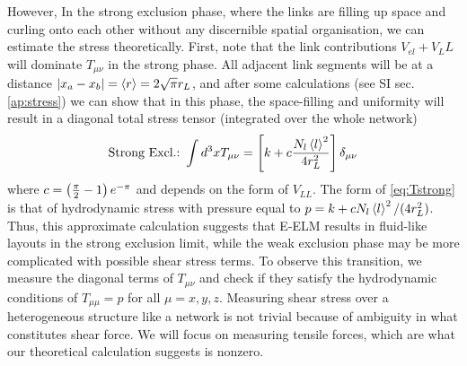 \documentclass[nofootinbib,preprint,floatfix,endfloats]{revtex4} %
\begin{document}
However, In the strong exclusion phase, where the links are filling up space and curling onto each other without any discernible spatial organisation, we can estimate the stress theoretically. First, note that the link contributions $V_{el}+V_LL$ will dominate $T_{\mu\nu}$ in the strong phase. All adjacent link segments will be at a distance $|x_a-x_b| = \left<r\right> = 2\sqrt{\pi} r_L$,
and after some calculations (see SI sec. \ref{ap:stress}) we can show that in this phase, the space-filling and uniformity will result in a diagonal total stress tensor (integrated over the whole network) 
\begin{equation}
    \mbox{Strong Excl.:\ }\int d^3x  T_{\mu\nu} = \left[ k + c{N_l \left<l\right>^2\over 4r_L^2}   \right]\delta_{\mu\nu} \label{eq:Tstrong}
\end{equation}
where $c = \left(  {\pi\over 2} -1  \right) e^{-\pi}$ and depends on the form of $V_{LL}$. 
The form of \eqref{eq:Tstrong} is that of  hydrodynamic stress with pressure equal to $ p =  k + c{N_l \left<l\right>^2/( 4r_L^2)}$. 
Thus, this approximate calculation suggests that E-ELM results in fluid-like layouts in the strong exclusion limit, while the weak exclusion phase may be more complicated with possible shear stress terms. 
To observe this transition, we measure the diagonal terms of $T_{\mu\nu}$ and check if they satisfy the hydrodynamic conditions of $T_{\mu\mu}=p$ for all $\mu=x,y,z$. 
Measuring shear stress over a heterogeneous structure like a network is not trivial because of ambiguity in what constitutes shear force. 
We will focus on measuring tensile forces, which are what our theoretical calculation suggests is nonzero.  


\end{document}
